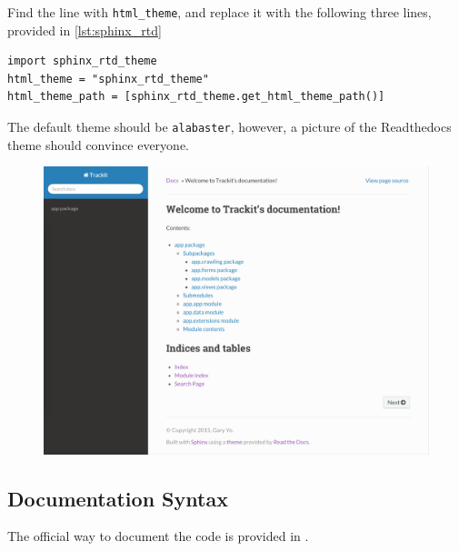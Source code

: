 \documentclass[../main/main.tex]{subfiles}
\begin{document}
Find the line with \lstinline|html_theme|, and replace it with the following
three lines, provided in \ref{lst:sphinx_rtd}

\begin{lstlisting}[caption=docs/conf.py,label=lst:sphinx_rtd]
import sphinx_rtd_theme
html_theme = "sphinx_rtd_theme"
html_theme_path = [sphinx_rtd_theme.get_html_theme_path()]
\end{lstlisting}

The default theme should be \lstinline|alabaster|, however, a picture of the
Readthedocs theme should convince everyone. 

\begin{figure}
\includegraphics[]{../figures/rtd_sphinx.png}
\end{figure}

\subsection{Documentation Syntax}

The official way to document the code is provided in \cite{sphinx:python}.
\end{document}
